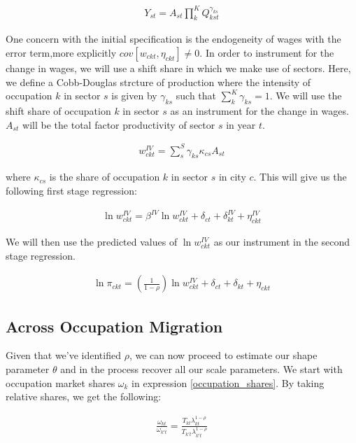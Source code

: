 \documentclass[10pt]{article}
\begin{document}
\begin{align*}
    Y_{st} = A_{st} \prod_{k}^{K} Q_{kst}^{\gamma_{ks}}
\end{align*}

One concern with the initial specification is the endogeneity of wages with the error term,more explicitly $cov[w_{ckt}, \eta_{ckt}] \neq 0$. In order to instrument for the change in wages, we will use a shift share in which we make use of sectors. Here, we define a Cobb-Douglas strcture of production where the intensity of occupation $k$ in sector $s$ is given by $\gamma_{ks}$ such that $\sum_{k}^{K} \gamma_{ks} = 1$. We will use the shift share of occupation $k$ in sector $s$ as an instrument for the change in wages. $A_{st}$ will be the total factor productivity of sector $s$ in year $t$.

\begin{align*}
    w_{ckt}^{IV} = \sum_{s}^{S} \gamma_{ks} \kappa_{cs} A_{st}
\end{align*}

where $\kappa_{cs}$ is the  share of occupation $k$ in sector $s$ in city $c$. This will give us the following first stage regression:

\begin{align*}
    \ln w_{ckt}^{IV} = \beta^{IV} \ln w_{ckt}^{IV} + \delta_{ct} + \delta_{kt}^{IV} + \eta_{ckt}^{IV}
\end{align*}

We will then use the predicted values of $\ln w_{ckt}^{IV}$ as our instrument in the second stage regression.

\begin{align*}
    \ln \pi_{ckt} = \left( \frac{1}{1 - \rho} \right) \ln w_{ckt}^{IV} + \delta_{ct} + \delta_{kt} + \eta_{ckt}
\end{align*}

\subsection{Across Occupation Migration}

Given that we've identified $\rho$, we can now proceed to estimate our shape parameter $\theta$ and in the process recover all our scale parameters. We start with occupation market shares $\omega_k$ in expression \ref{occupation_shares}. By taking relative shares, we get the following:

\begin{align*}
    \frac{\omega_{kt}}{\omega_{k't}} = \frac{T_{kt} \lambda_{kt}^{1 - \rho}}{T_{k't} \lambda_{k't}^{1 - \rho}}
\end{align*}
\end{document}
